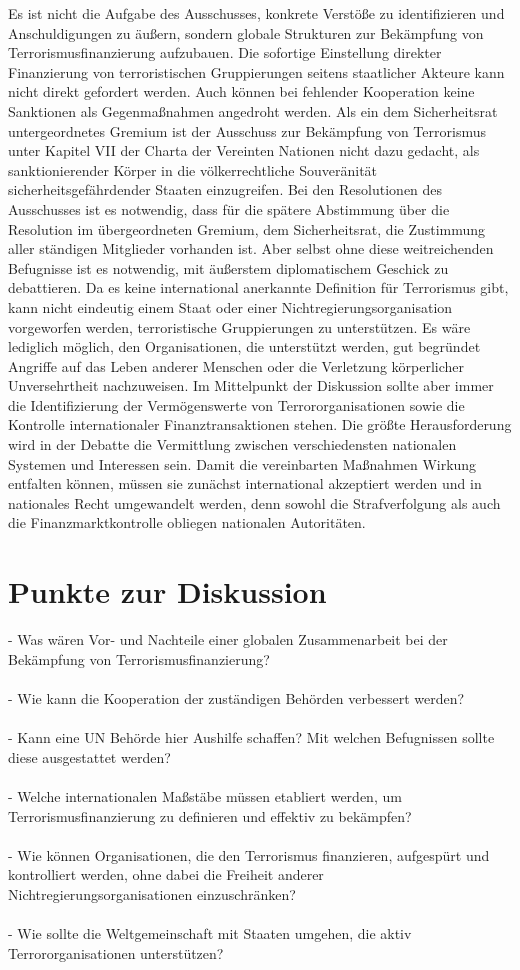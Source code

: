 \documentclass[a4paper,11pt]{article}
\begin{document}
Es ist nicht die Aufgabe des Ausschusses, konkrete Verstöße zu identifizieren und Anschuldigungen zu äußern, sondern globale Strukturen zur Bekämpfung von Terrorismusfinanzierung aufzubauen. Die sofortige Einstellung direkter Finanzierung von terroristischen Gruppierungen seitens staatlicher Akteure kann nicht direkt gefordert werden. Auch können bei fehlender Kooperation keine Sanktionen als Gegenmaßnahmen angedroht werden. Als ein dem Sicherheitsrat untergeordnetes Gremium ist der Ausschuss zur Bekämpfung von Terrorismus unter Kapitel VII der Charta der Vereinten Nationen nicht dazu gedacht, als sanktionierender Körper in die völkerrechtliche Souveränität sicherheitsgefährdender Staaten einzugreifen. Bei den Resolutionen des Ausschusses ist es notwendig, dass für die spätere Abstimmung über die Resolution im übergeordneten Gremium, dem Sicherheitsrat, die Zustimmung aller ständigen Mitglieder vorhanden ist. Aber selbst ohne diese weitreichenden Befugnisse ist es notwendig, mit äußerstem diplomatischem Geschick zu debattieren. Da es keine international anerkannte Definition für Terrorismus gibt, kann nicht eindeutig einem Staat oder einer Nichtregierungsorganisation vorgeworfen werden, terroristische Gruppierungen zu unterstützen. Es wäre lediglich möglich, den Organisationen, die unterstützt werden, gut begründet Angriffe auf das Leben anderer Menschen oder die Verletzung körperlicher Unversehrtheit nachzuweisen. Im Mittelpunkt der Diskussion sollte aber immer die Identifizierung der Vermögenswerte von Terrororganisationen sowie die Kontrolle internationaler Finanztransaktionen stehen. Die größte Herausforderung wird in der Debatte die Vermittlung zwischen verschiedensten nationalen Systemen und Interessen sein. Damit die vereinbarten Maßnahmen Wirkung entfalten können, müssen sie zunächst international akzeptiert werden und in nationales Recht umgewandelt werden, denn sowohl die Strafverfolgung als auch die Finanzmarktkontrolle obliegen nationalen Autoritäten. 
    \section{Punkte zur Diskussion}
- Was wären Vor- und Nachteile einer globalen Zusammenarbeit bei der Bekämpfung von Terrorismusfinanzierung? \\ \\ - Wie kann die Kooperation der zuständigen Behörden verbessert werden? \\ \\ - Kann eine UN Behörde hier Aushilfe schaffen? Mit welchen Befugnissen sollte diese ausgestattet werden? \\ \\ - Welche internationalen Maßstäbe müssen etabliert werden, um Terrorismusfinanzierung zu definieren und effektiv zu bekämpfen? \\ \\ - Wie können Organisationen, die den Terrorismus finanzieren, aufgespürt und kontrolliert werden, ohne dabei die Freiheit anderer Nichtregierungsorganisationen einzuschränken? \\ \\ - Wie sollte die Weltgemeinschaft mit Staaten umgehen, die aktiv Terrororganisationen unterstützen? 
\end{document}
